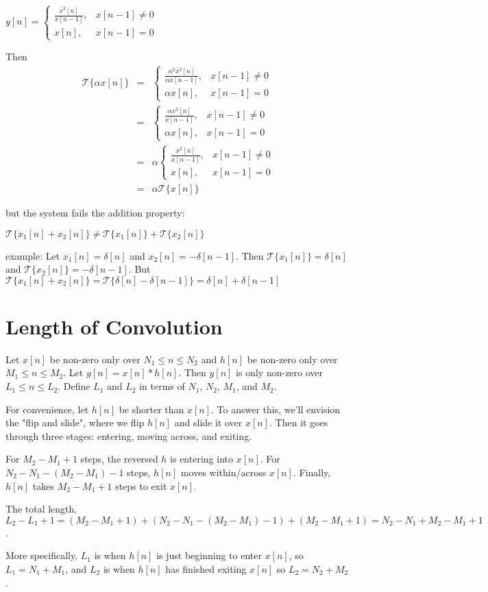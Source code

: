 \documentclass[11pt]{article}
\begin{document}
{\color{blue}
$y[n] = \begin{cases} \frac{x^2[n]}{x[n-1]}, & x[n-1] \neq 0 \\
x[n], & x[n-1] = 0 \end{cases} $

Then 
\begin{eqnarray*}\mathcal{T}\{\alpha x[n]\} &=& \begin{cases} \frac{\alpha^2 x^2[n]}{\alpha x[n-1]}, & x[n-1] \neq 0 \\
\alpha x[n], & x[n-1] = 0 \end{cases}  \\
&=& \begin{cases} \frac{\alpha x^2[n]}{x[n-1]}, & x[n-1] \neq 0 \\
\alpha x[n], & x[n-1] = 0 \end{cases} \\
&=& \alpha \begin{cases} \frac{ x^2[n]}{x[n-1]}, & x[n-1] \neq 0 \\
x[n], & x[n-1] = 0 \end{cases} \\
&=& \alpha \mathcal{T}\{x[n]\}
\end{eqnarray*}

but the system fails the addition property:

$\mathcal{T}\{x_1[n]+x_2[n]\} \neq \mathcal{T}\{x_1[n]\} + \mathcal{T}\{x_2[n]\}$

example: Let $x_1[n] = \delta[n]$ and $x_2[n] = -\delta[n-1]$. Then $\mathcal{T}\{x_1[n]\} = \delta[n]$ and $\mathcal{T}\{x_2[n]\} = -\delta[n-1]$. But $\mathcal{T}\{x_1[n]+x_2[n]\} = \mathcal{T}\{\delta[n]-\delta[n-1]\} = \delta[n]+\delta[n-1]$

%
}

\section{Length of Convolution}
Let $x[n]$ be non-zero only over $N_1 \leq n \leq N_2$ and $h[n]$ be non-zero only over $M_1 \leq n \leq M_2$. Let $y[n]=x[n]*h[n]$. Then $y[n]$ is only non-zero over $L_1 \leq n \leq L_2$. Define $L_1$ and $L_2$ in terms of $N_1$, $N_2$, $M_1$, and $M_2$.

{\color{blue}
For convenience, let $h[n]$ be shorter than $x[n]$. To answer this, we'll envision the "flip and slide", where we flip $h[n]$ and slide it over $x[n]$. Then it goes through three stages: entering, moving across, and exiting.

For $M_2-M_1+1$ steps, the reversed $h$ is entering into $x[n]$. For $N_2-N_1-(M_2-M_1)-1$ steps, $h[n]$ moves within/across $x[n]$. Finally, $h[n]$ takes $M_2-M_1+1$ steps to exit $x[n]$. 

The total length, $L_2-L_1+1 = (M_2-M_1+1)+(N_2-N_1-(M_2-M_1)-1) + (M_2-M_1+1) = N_2-N_1+M_2-M_1+1$.

More specifically, $L_1$ is when $h[n]$ is just beginning to enter $x[n]$, so $L_1 = N_1+M_1$, and $L_2$ is when $h[n]$ has finished exiting $x[n]$ so $L_2=N_2+M_2$.

}
\end{document}
